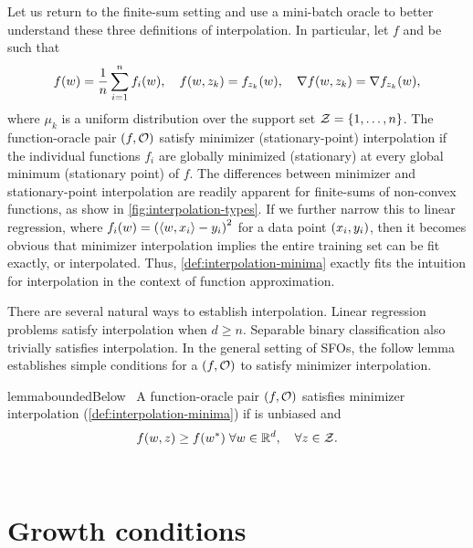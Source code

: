 Let us return to the finite-sum setting and use a mini-batch oracle to better understand these three definitions of interpolation.
In particular, let \( f \) and \oracle{} be such that
\[ f(\w) =  \frac{1}{n} \sum_{i=1}^{n} f_i(\w), \quad f(\w, \zk) = f_{\zk}(\w), \quad \grad(\w, \zk) = \grad_{\zk}(\w),  \]
where \( \mu_k \) is a uniform distribution over the support set \( \calZ = \cbr{1, \ldots, n} \).
The function-oracle pair \( \rbr{f, \oracle{}} \) satisfy minimizer (stationary-point) interpolation if the individual functions \( f_i \) are globally minimized (stationary) at every global minimum (stationary point) of \( f \).
The differences between minimizer and stationary-point interpolation are readily apparent for finite-sums of non-convex functions, as show in \autoref{fig:interpolation-types}.
If we further narrow this to linear regression, where \( f_i(\w) = \rbr{\abr{\w, x_i} - y_i}^2 \) for a data point \( \rbr{x_i, y_i} \), then it becomes obvious that minimizer interpolation implies the entire training set can be fit exactly, or interpolated.
Thus, \autoref{def:interpolation-minima} exactly fits the intuition for interpolation in the context of function approximation.

There are several natural ways to establish interpolation.
Linear regression problems satisfy interpolation when \( d \geq n \).
Separable binary classification also trivially satisfies interpolation.
In the general setting of \acp{SFO}, the follow lemma establishes simple conditions for a \( \rbr{f, \oracle{}} \) to satisfy minimizer interpolation.
\begin{restatable}{lemma}{boundedBelow}~\label{thm:bounded-below}
    A function-oracle pair \( \rbr{f, \oracle{}} \) satisfies minimizer interpolation (\autoref{def:interpolation-minima}) if \oracle{} is unbiased and 
    \[ f(\w, \z ) \geq f(\wopt) \; \forall \w \in \R^d,  \quad \forall \z \in \calZ. \]
\end{restatable}
\\

\section{Growth conditions}\label{sec:growth_conditions}

